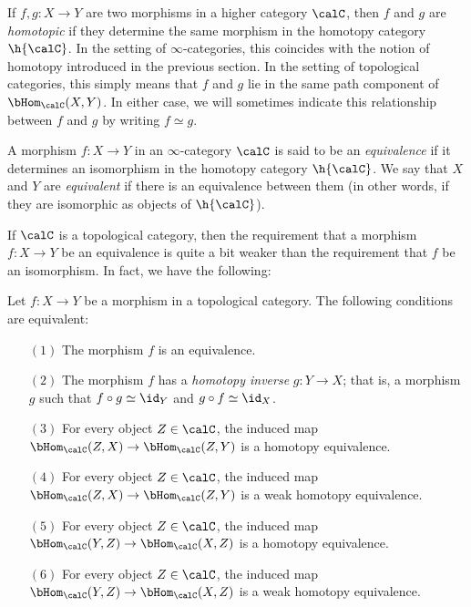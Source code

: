 If $f,g: X \rightarrow Y$ are two morphisms in a higher category $\calC$, then $f$ and $g$
are {\it homotopic} if they determine the same morphism in the homotopy category $\h{\calC}$. In the setting of $\infty$-categories, this coincides with the notion of homotopy introduced in the previous section. In the setting of
topological categories, this simply means that $f$ and $g$ lie
in the same path component of $\bHom_{\calC}(X,Y)$. In either case,
we will sometimes indicate this relationship between $f$ and $g$ by writing $f
\simeq g$.

A morphism $f: X \rightarrow Y$ in an $\infty$-category $\calC$ is
said to be an {\it equivalence} if it determines an isomorphism in the homotopy category
$\h{\calC}$. We say that $X$ and $Y$ are {\it equivalent} if there is
an equivalence between them (in other words, if they are
isomorphic as objects of $\h{\calC}$).

If $\calC$ is a topological category, then the
requirement that a morphism $f: X \rightarrow Y$ be an equivalence
is quite a bit weaker than the requirement that $f$ be an
isomorphism. In fact, we have the following:

\begin{proposition}\label{rooot}
Let $f: X \rightarrow Y$ be a morphism in a topological category.
The following conditions are equivalent:

\begin{itemize}
\item[$(1)$] The morphism $f$ is an equivalence.

\item[$(2)$] The morphism $f$ has a {\it homotopy inverse} $g: Y
\rightarrow X$; that is, a morphism $g$ such that $f \circ g
\simeq \id_Y$ and $g \circ f \simeq \id_X$.

\item[$(3)$] For every object $Z \in \calC$, the induced map
$\bHom_{\calC}(Z,X) \rightarrow \bHom_{\calC}(Z,Y)$ is a homotopy
equivalence.

\item[$(4)$] For every object $Z \in \calC$, the induced map
$\bHom_{\calC}(Z,X) \rightarrow \bHom_{\calC}(Z,Y)$ is a weak
homotopy equivalence.

\item[$(5)$] For every object $Z \in \calC$, the induced map
$\bHom_{\calC}(Y,Z) \rightarrow \bHom_{\calC}(X,Z)$ is a homotopy
equivalence.

\item[$(6)$] For every object $Z \in \calC$, the induced map
$\bHom_{\calC}(Y,Z) \rightarrow \bHom_{\calC}(X,Z)$ is a weak
homotopy equivalence.
\end{itemize}
\end{proposition}

